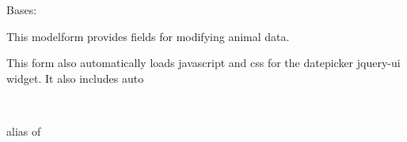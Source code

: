 \documentclass[letterpaper,10pt,english]{sphinxmanual}
\begin{document}
\begin{fulllineitems}
\label{api:animal.forms.AnimalForm}
Bases: 

This modelform provides fields for modifying animal data.

This form also automatically loads javascript and css for the datepicker jquery-ui widget.  It also includes auto

\begin{fulllineitems}
\label{api:animal.forms.AnimalForm.Media}
\end{fulllineitems}


\begin{fulllineitems}
\label{api:animal.forms.AnimalForm.Meta}~

\begin{fulllineitems}
\label{api:animal.forms.AnimalForm.Meta.model}
alias of 

\end{fulllineitems}


\end{fulllineitems}


\begin{fulllineitems}
\label{api:animal.forms.AnimalForm.media}
\end{fulllineitems}


\end{fulllineitems}

\end{document}
